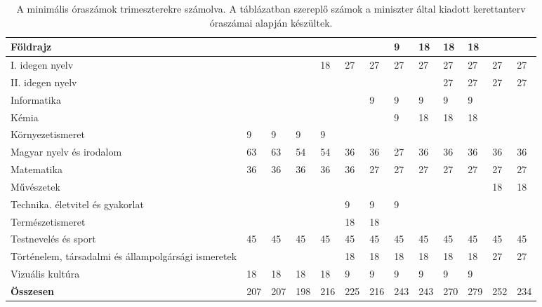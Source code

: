 \begin{landscape}
\begin{table}[]
\begin{tabular}{l|l|l|l|l|l|l|l|l|l|l|l|l}
    Földrajz                                            &     &     &     &     &     &     & 9   & 18  & 18  & 18  &     &     \\\hline
    I. idegen nyelv                                     &     &     &     & 18  & 27  & 27  & 27  & 27  & 27  & 27  & 27  & 27  \\\hline
    II. idegen nyelv                                    &     &     &     &     &     &     &     &     & 27  & 27  & 27  & 27  \\\hline
    Informatika                                         &     &     &     &     &     & 9   & 9   & 9   & 9   & 9   &     &     \\\hline
    Kémia                                               &     &     &     &     &     &     & 9   & 18  & 18  & 18  &     &     \\\hline
    Környezetismeret                                    & 9   & 9   & 9   & 9   &     &     &     &     &     &     &     &     \\\hline
    Magyar nyelv és irodalom                            & 63  & 63  & 54  & 54  & 36  & 36  & 27  & 36  & 36  & 36  & 36  & 36  \\\hline
    Matematika                                          & 36  & 36  & 36  & 36  & 36  & 27  & 27  & 27  & 27  & 27  & 27  & 27  \\\hline
    Művészetek                                          &     &     &     &     &     &     &     &     &     &     & 18  & 18  \\\hline
    Technika. életvitel és gyakorlat                    &     &     &     &     & 9   & 9   & 9   &     &     &     &     &     \\\hline
    Természetismeret                                    &     &     &     &     & 18  & 18  &     &     &     &     &     &     \\\hline
    Testnevelés és sport                                & 45  & 45  & 45  & 45  & 45  & 45  & 45  & 45  & 45  & 45  & 45  & 45  \\\hline
    Történelem, társadalmi és állampolgársági ismeretek &     &     &     &     & 18  & 18  & 18  & 18  & 18  & 18  & 27  & 27  \\\hline
    Vizuális kultúra                                    & 18  & 18  & 18  & 18  & 9   & 9   & 9   & 9   & 9   & 9   &     &     \\\hline \hline
    \textbf{Összesen}                                   & 207 & 207 & 198 & 216 & 225 & 216 & 243 & 243 & 270 & 279 & 252 & 234
    

  \end{tabular}
  \caption{A minimális óraszámok trimeszterekre számolva. A táblázatban szereplő számok a miniszter által kiadott kerettanterv óraszámai alapján készültek.}  
  \label{tbl:oraszamok}
\end{table}

\end{landscape}